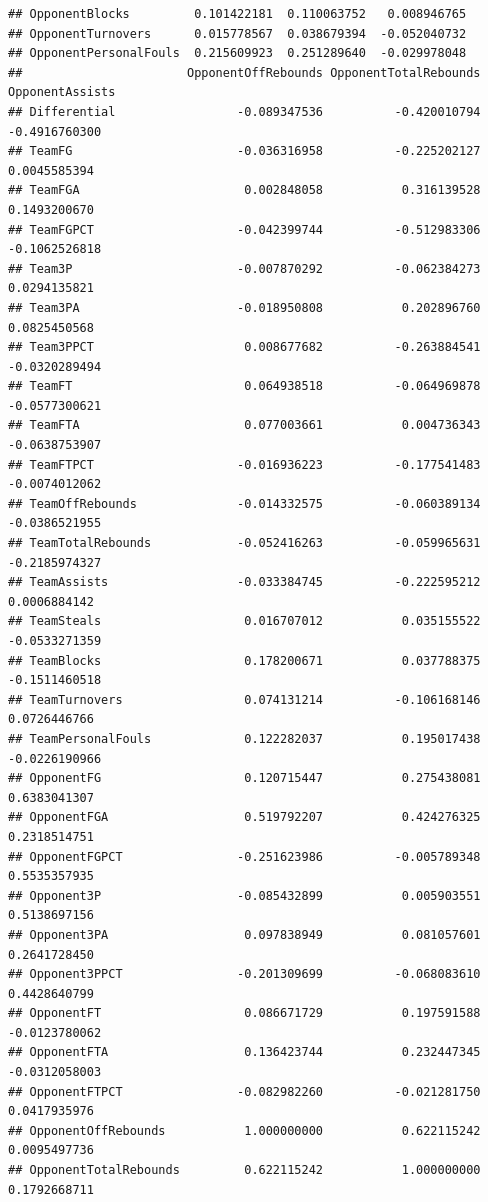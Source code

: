 \documentclass[]{book}
\begin{document}
\begin{verbatim}
## OpponentBlocks         0.101422181  0.110063752   0.008946765
## OpponentTurnovers      0.015778567  0.038679394  -0.052040732
## OpponentPersonalFouls  0.215609923  0.251289640  -0.029978048
##                       OpponentOffRebounds OpponentTotalRebounds OpponentAssists
## Differential                 -0.089347536          -0.420010794   -0.4916760300
## TeamFG                       -0.036316958          -0.225202127    0.0045585394
## TeamFGA                       0.002848058           0.316139528    0.1493200670
## TeamFGPCT                    -0.042399744          -0.512983306   -0.1062526818
## Team3P                       -0.007870292          -0.062384273    0.0294135821
## Team3PA                      -0.018950808           0.202896760    0.0825450568
## Team3PPCT                     0.008677682          -0.263884541   -0.0320289494
## TeamFT                        0.064938518          -0.064969878   -0.0577300621
## TeamFTA                       0.077003661           0.004736343   -0.0638753907
## TeamFTPCT                    -0.016936223          -0.177541483   -0.0074012062
## TeamOffRebounds              -0.014332575          -0.060389134   -0.0386521955
## TeamTotalRebounds            -0.052416263          -0.059965631   -0.2185974327
## TeamAssists                  -0.033384745          -0.222595212    0.0006884142
## TeamSteals                    0.016707012           0.035155522   -0.0533271359
## TeamBlocks                    0.178200671           0.037788375   -0.1511460518
## TeamTurnovers                 0.074131214          -0.106168146    0.0726446766
## TeamPersonalFouls             0.122282037           0.195017438   -0.0226190966
## OpponentFG                    0.120715447           0.275438081    0.6383041307
## OpponentFGA                   0.519792207           0.424276325    0.2318514751
## OpponentFGPCT                -0.251623986          -0.005789348    0.5535357935
## Opponent3P                   -0.085432899           0.005903551    0.5138697156
## Opponent3PA                   0.097838949           0.081057601    0.2641728450
## Opponent3PPCT                -0.201309699          -0.068083610    0.4428640799
## OpponentFT                    0.086671729           0.197591588   -0.0123780062
## OpponentFTA                   0.136423744           0.232447345   -0.0312058003
## OpponentFTPCT                -0.082982260          -0.021281750    0.0417935976
## OpponentOffRebounds           1.000000000           0.622115242    0.0095497736
## OpponentTotalRebounds         0.622115242           1.000000000    0.1792668711

\end{verbatim}
\end{document}
